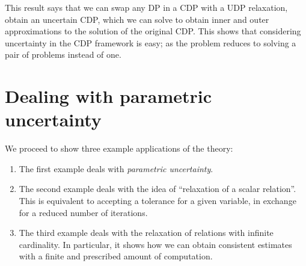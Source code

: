 

This result says that we can swap any DP in a CDP with a UDP relaxation, obtain an uncertain CDP, which we can solve to obtain inner and outer approximations to the solution of the original CDP.
This shows that considering uncertainty in the CDP framework is easy; as the problem reduces to solving a pair of problems instead of one.

\section[Parametric uncertainty]{Dealing with parametric uncertainty}
\label{sec:Applications}

We proceed to show three example applications of the theory:
\begin{enumerate}
    \item The first example deals with \emph{parametric uncertainty}.
    \item The second example deals with the idea of ``relaxation of a scalar relation''.
          This is equivalent to accepting a tolerance for a given variable, in exchange for a reduced number of iterations.
    \item The third example deals with the relaxation of relations with infinite cardinality.
          In particular, it shows how we can obtain consistent estimates with a finite and prescribed amount of computation.
\end{enumerate}

